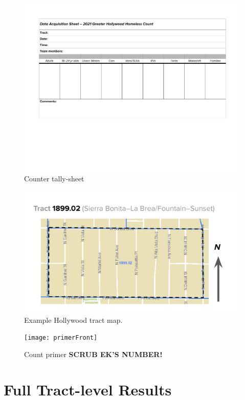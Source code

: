 \documentclass[11pt,twocolumn]{article}
\def\bfr{\bf\color{red}}
\begin{document}
\begin{figure}
	\centering
	\includegraphics[width =\linewidth]{Hollywood2021CountDataSheet}
	\caption{Counter tally-sheet}
\end{figure}

\begin{figure}
	\centering
	\includegraphics[width =\linewidth]{tractMap}
	\caption{Example Hollywood tract map.}
\end{figure}

\begin{figure}
	\centering
	\texttt{[image: primerFront]}
	\caption{Count primer {\bfr SCRUB EK'S NUMBER!}}
\end{figure}

\section{Full Tract-level Results}
\end{document}
